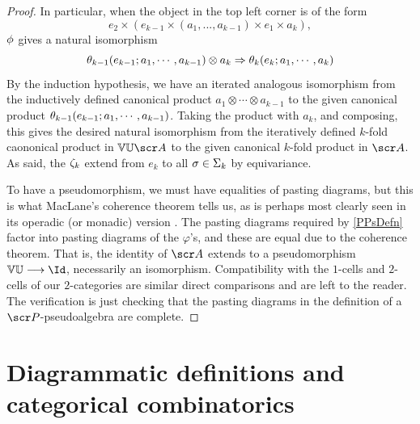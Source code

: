 \documentclass{amsart}
\theoremstyle{definition}
\numberwithin{equation}{section}
\begin{document}
\begin{proof}
In particular, when the object in the top left corner is of the form
$$e_2\times (e_{k-1}\times (a_1,...,a_{k-1})\times e_1\times a_k),$$
$\phi$ gives a natural isomorphism
$$  \theta_{k-1}(e_{k-1};a_1, \cdots, a_{k-1})\otimes a_k \Rightarrow \theta_k(e_k;a_1,\cdots, a_k)  $$
By the induction hypothesis, we have an iterated analogous isomorphism from the inductively defined canonical product 
$a_1\otimes \cdots \otimes a_{k-1}$ to the given canonical product $\theta_{k-1}(e_{k-1};a_1, \cdots, a_{k-1})$.  Taking the product  with $a_k$, and composing, this gives the desired natural isomorphism from the iteratively defined $k$-fold caononical product in $\bV\bU \sA$ to the given canonical $k$-fold product in $\sA$.  As said, the $\zeta_k$ extend from $e_k$ to all $\sigma\in \Sigma_k$ by equivariance. 

To have a pseudomorphism, we must have equalities of pasting diagrams, but this is what MacLane's coherence theorem \cite[Section XI.1]{Mac} tells us, as is perhaps most clearly seen in its 
operadic (or monadic) version \cite[Theorem 3.2]{Lack}.  The pasting diagrams 
required by \autoref{PPsDefn} factor into pasting diagrams of the $\varphi$'s, and these are equal due to the coherence theorem.   That is, the identity of $\sA$ extends to a pseudomorphism $\bV\bU \rtarr \Id$, necessarily an isomorphism.  Compatibility with the $1$-cells and $2$-cells of our $2$-categories are similar direct comparisons and are left to the reader.  The verification is just checking that the pasting diagrams in the definition of a $\sP$-pseudoalgebra are complete.
 \end{proof}

\section{Diagrammatic definitions and categorical combinatorics}\label{Sec4}
\end{document}

